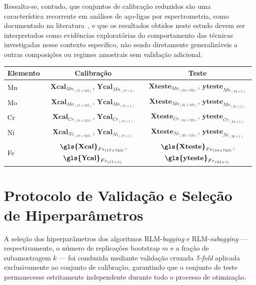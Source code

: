 Ressalta-se, contudo, que conjuntos de calibração reduzidos são uma característica recorrente em análises de aço-ligas por espectrometria, como documentado na literatura~\cite{PIMENTEL:1998,KRAMER:1998}, e que os resultados obtidos neste estudo devem ser interpretados como evidências exploratórias do comportamento das técnicas investigadas nesse contexto específico, não sendo diretamente generalizáveis a outras composições ou regimes amostrais sem validação adicional.

\def\mna{(17 \times 723)}\def\mnb{(17 \times 1)}
\def\mnc{(34 \times 723)}\def\mnd{(21 \times 1)}
\def\mne{(21 \times 723)}\def\mnf{(34 \times 1)}
\def\mng{(20 \times 1)}\def\mnh{(20 \times 1)}
\def\mni{(20 \times 723)}\def\mnj{(17 \times 1)}
\begin{quadro}[ht]
\centering
\caption{Dimensões dos conjuntos de dados para diferentes elementos.}
\begin{tabular}{|l|c|c|}
\hline
\textbf{Elemento} & \textbf{Calibração} & \textbf{Teste} \\
\hline
Mn & $\textbf{Xcal}_{Mn_{\mna}}$, $\textbf{Ycal}_{Mn_{\mnb}}$ & $\textbf{Xteste}_{Mn_{\mnc}}$, $\textbf{yteste}_{Mn_{\mnf}}$ \\
Mo & $\textbf{Xcal}_{Mo_{\mna}}$, $\textbf{Ycal}_{Mo_{\mnb}}$ & $\textbf{Xteste}_{Mo_{\mne}}$, $\textbf{yteste}_{Mo_{\mnd}}$ \\
Cr & $\textbf{Xcal}_{Cr_{\mna}}$, $\textbf{Ycal}_{Cr_{\mnb}}$ & $\textbf{Xteste}_{Cr_{\mnc}}$, $\textbf{yteste}_{Cr_{\mnf}}$ \\
Ni & $\textbf{Xcal}_{Ni_{\mna}}$, $\textbf{Ycal}_{Ni_{\mnb}}$ & $\textbf{Xteste}_{Ni_{\mni}}$, $\textbf{yteste}_{Ni_{\mnh}}$ \\
Fe & $\textbf{\gls{Xcal}}_{Fe_{\mna}}$, $\textbf{\gls{Ycal}}_{Fe_{\mnb}}$ & $\textbf{\gls{Xteste}}_{Fe_{\mnc}}$, $\textbf{\gls{yteste}}_{Fe_{\mnf}}$ \\
\hline
\end{tabular}
\label{tab:conjuntos_subscritos}
\end{quadro}

\section{Protocolo de Validação e Seleção de Hiperparâmetros}
\label{sec:protocolo}

A seleção dos hiperparâmetros dos algoritmos RLM-\textit{bagging} e 
RLM-\textit{subagging} --- respectivamente, o número de replicações 
bootstrap $m$ e a fração de subamostragem $k$ --- foi conduzida 
mediante validação cruzada \textit{5-fold} aplicada exclusivamente 
ao conjunto de calibração, garantindo que o conjunto de teste 
permanecesse estritamente independente durante todo o processo de 
otimização.

